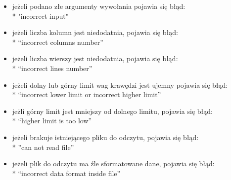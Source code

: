 \documentclass[12pt]{article}
\begin{document}
\begin{itemize}
\item
jeżeli podano złe argumenty wywołania pojawia się błąd:\\*
"incorrect input"
\item
jeżeli liczba kolumn jest niedodatnia, pojawia się błąd:\\*
“incorrect columns number”
\item
jeżeli liczba wierszy jest niedodatnia, pojawia się błąd:\\* 
“incorrect lines number”
\item
jeżeli dolny lub górny limit wag krawędzi jest ujemny pojawia się błąd:\\* “incorrect lower limit or incorrect higher limit”
\item
jeżli górny limit jest mniejszy od dolnego limitu, pojawia się błąd:\\* 
“higher limit is too low”
\item
jeżeli brakuje istniejącego pliku do odczytu, pojawia się błąd:\\* 
”can not read file”
\item
jeżeli plik do odczytu ma źle sformatowane dane, pojawia się błąd:\\* 
“incorrect data format inside file”
\end{itemize}
\end{document}
